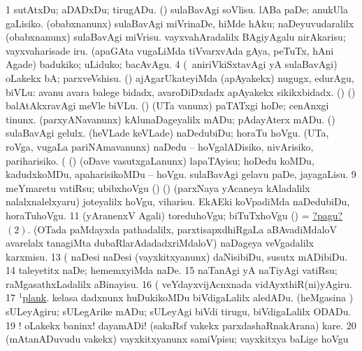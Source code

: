 \noindent 
\gl{\pagu}
\expl{}
\bmng
\bnum
\num{1}  sutAtxDu; aDADxDu; tirugADu. 
\hypertarget{walk pagu2}{} 
  (\AmA) 
\banum
{} sulaBavAgi soVlisu. 
 lABa paDe; anukUla gaLisiko. 
\eanum
\numie
{}  
\banum
{} (obabxnanunx) sulaBavAgi miVrinaDe, hiMde hAku; naDeyuvudaralilx (obabxnanunx) sulaBavAgi miVrisu. 
 vayxvahAradalilx BAgiyAgalu nirAkarisu; vayxvaharisade iru. 
 (apaGAta \mo vugaLiMda tiVvarxvAda gAya, peTuTx, hAni Agade) badukiko; uLiduko; bacAvAgu. 
\eanum
\numie
\num{4}  (\kanmu\ aniriVkiSxtavAgi yA sulaBavAgi) oLakekx bA; parxveVshisu. 
  
\banum
{} (\AmA) ajAgarUkateyiMda (apAyakekx) nugugx, edurAgu, biVLu:  avanu avara balege bidadx, avaroDiDxdadx apAyakekx sikikxbidadx. 
 (\ashi) (\pArxparx) balAtAkxravAgi meVle biVLu. 
 (\ashi) (UTa \mo vanunx) paTATxgi hoDe; cenAnxgi tinunx. 
\eanum
\numie
{}  
\banum
{} (parxyANavanunx) kAlunaDageyalilx mADu; pAdayAterx mADu. 
 (\AmA) sulaBavAgi gelulx. 
\eanum
\numie
{}  
\banum
{} (heVLade keVLade) naDedubiDu; horaTu hoVgu. 
 (UTa, roVga, \mo vugaLa pariNAmavanunx) naDedu -- hoVgalADisiko, nivArisiko, pariharisiko. 
\eanum
\numie
{}  (  (\AmA) 
\banum
{} (oDave vasutxgaLanunx) lapaTAyisu; hoDedu koMDu, kadudxkoMDu, apaharisikoMDu -- hoVgu. 
 sulaBavAgi gelavu paDe, jayagaLisu. 
\eanum
\numie
\num{9}  meYmaretu vatiRsu; ubibxhoVgu 
  
\banum
{} (\birx) (\pArxparx) (parxNaya yAcaneya kAladalilx nalalxnalelxyaru) joteyalilx hoVgu, viharisu. 
 EkAEki koVpadiMda naDedubiDu, horaTuhoVgu. 
\eanum
\numie
\num{11}  (yAranenxV Agali) toreduhoVgu; biTuTxhoVgu 
  
\banum
{} (\AmA) = \hyperlink{walk pagu2}{?pagu? \((2)\)}. 
 (OTada paMdayxda pathadalilx, parxtisapxdhiRgaLa aBAvadiMdaloV avarelalx tanagiMta dubaRlarAdadadxriMdaloV) naDageya veVgadalilx karxmisu. 
\eanum
\numie
\num{13}  (  naDesi naDesi (vayxkitxyanunx) daNisibiDu, susutx mADibiDu. 
\num{14}  taleyetitx naDe; hememxyiMda naDe. 
\num{15}  naTanAgi yA naTiyAgi vatiRsu; raMgasathxLadalilx aBinayisu. 
\num{16}  (  veYdayxvijAcnxnada vidAyxthiR(ni)yAgiru. 
\num{17}  \hyperref{kandict_p.pdf}{P}{plank(1)pagu}{$^1$plank}. 
  
\banum
{} kelasa \mo dadxnunx huDukikoMDu biVdigaLalilx aledADu. 
 (heMgasina \vi) sULeyAgiru; sULegArike mADu; sULeyAgi biVdi tirugu, biVdigaLalilx ODADu. 
\eanum
\numie
\num{19} ! oLakekx baninx! dayamADi! (sakaRsf \mo vakekx parxdashaRnakArana) kare. 
\num{20}  (mAtanADuvudu \mo vakekx) vayxkitxyanunx samiVpisu; vayxkitxya baLige hoVgu 
\enum
\emng
\eentry

